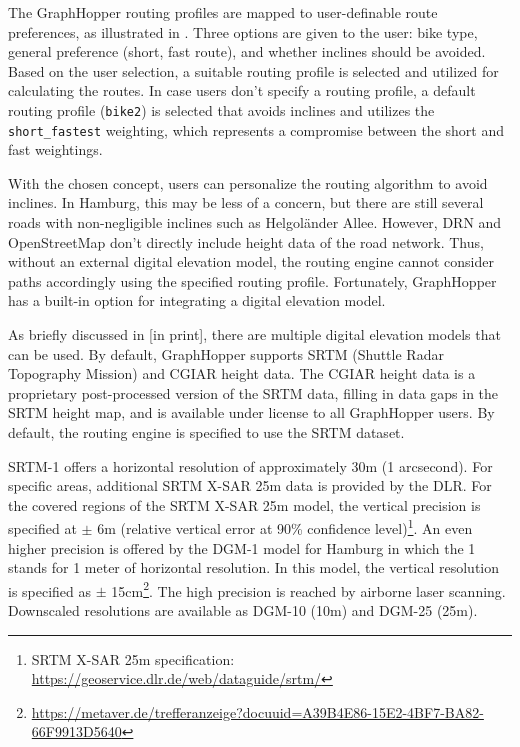 The GraphHopper routing profiles are mapped to user-definable route preferences, as illustrated in . Three options are given to the user: bike type, general preference (short, fast route), and whether inclines should be avoided. Based on the user selection, a suitable routing profile is selected and utilized for calculating the routes. In case users don't specify a routing profile, a default routing profile (\texttt{bike2}) is selected that avoids inclines and utilizes the \texttt{short\_fastest} weighting, which represents a compromise between the short and fast weightings.

With the chosen concept, users can personalize the routing algorithm to avoid inclines. In Hamburg, this may be less of a concern, but there are still several roads with non-negligible inclines such as Helgoländer Allee. However, DRN and OpenStreetMap don't directly include height data of the road network. Thus, without an external digital elevation model, the routing engine cannot consider paths accordingly using the specified routing profile. Fortunately, GraphHopper has a built-in option for integrating a digital elevation model.

As briefly discussed in [in print], there are multiple digital elevation models that can be used. By default, GraphHopper supports SRTM (Shuttle Radar Topography Mission) \cite{farr_shuttle_2000, farr_shuttle_2007} and CGIAR \cite{jarvis_hole_2008} height data. The CGIAR height data is a proprietary post-processed version of the SRTM data, filling in data gaps in the SRTM height map, and is available under license to all GraphHopper users. By default, the routing engine is specified to use the SRTM dataset.

SRTM-1 offers a horizontal resolution of approximately 30m (1 arcsecond). For specific areas, additional SRTM X-SAR 25m data is provided by the DLR. For the covered regions of the SRTM X-SAR 25m model, the vertical precision is specified at $\pm$ 6m (relative vertical error at 90\% confidence level)\footnote{SRTM X-SAR 25m specification: \url{https://geoservice.dlr.de/web/dataguide/srtm/}}. An even higher precision is offered by the DGM-1 model for Hamburg in which the 1 stands for 1 meter of horizontal resolution. In this model, the vertical resolution is specified as $\pm$ 15cm\footnote{\url{https://metaver.de/trefferanzeige?docuuid=A39B4E86-15E2-4BF7-BA82-66F9913D5640}}. The high precision is reached by airborne laser scanning. Downscaled resolutions are available as DGM-10 (10m) and DGM-25 (25m).

